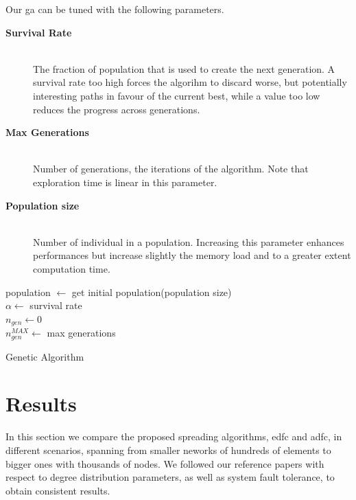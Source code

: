 \documentclass[12pt,journal,draftclsnofoot,onecolumn]{IEEEtran}
\DeclarePairedDelimiter\floor{\lfloor}{\rfloor}
\begin{document}
Our \gls{ga} can be tuned with the following parameters.
\begin{description}
	\item[\textbf{Survival Rate}] \hfill \\
	The fraction of population that is used to create the next generation. A survival rate too high forces the algorihm to discard worse, but potentially interesting paths in favour of the current best, while a value too low reduces the progress across generations.
	\item[\textbf{Max Generations}] \hfill \\
	Number of generations, the iterations of the algorithm. Note that exploration time is linear in this parameter.
	\item[\textbf{Population size}] \hfill \\
	Number of individual in a population. Increasing this parameter enhances performances but increase slightly the memory load and to a greater extent computation time.
\end{description}


\begin{algorithm}
	population $\gets$ get initial population(population size) \\
	$\alpha \gets$ survival rate \\
	$n_{gen} \gets 0$ \\
	$n_{gen}^{MAX} \gets$ max generations \\
	\caption{Genetic Algorithm}\label{algo:GA}
\end{algorithm}

\clearpage
\section{Results} \label{sec:results}
In this section we compare the proposed spreading algorithms, \gls{edfc} and \gls{adfc}, in different scenarios, spanning from smaller neworks of hundreds of elements to bigger ones with thousands of nodes.
We followed our reference papers \cite{Lin2007} \cite{Aly2008} with respect to degree distribution parameters, as well as system fault tolerance, to obtain consistent results.
\end{document}
